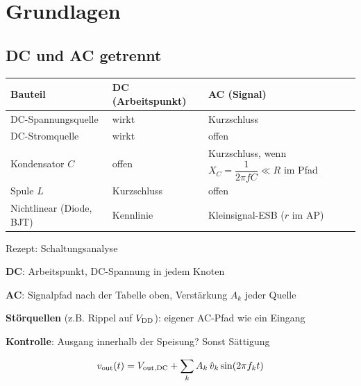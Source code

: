 \section{Grundlagen}\label{sec:grundlagen}

\subsection{DC und AC getrennt}

{\renewcommand{\arraystretch}{1.5}
\begin{tabularx}{\columnwidth}{@{}l l X@{}}
	\toprule
	\textbf{Bauteil}   & \textbf{DC (Arbeitspunkt)} & \textbf{AC (Signal)} \\ \midrule
	DC-Spannungsquelle & wirkt                      & Kurzschluss \\
	DC-Stromquelle     & wirkt                      & offen \\
	Kondensator $C$    & offen                      & Kurzschluss, wenn $X_C = \dfrac{1}{2\pi f C} \ll R$ im Pfad \\
	Spule $L$          & Kurzschluss                & offen \\
	Nichtlinear (Diode, BJT) & Kennlinie            & Kleinsignal-ESB ($r$ im AP) \\ \bottomrule
\end{tabularx}}

\begin{rezept}{Rezept: Schaltungsanalyse}
	\begin{steps}
		\item \textbf{DC}: Arbeitspunkt, DC-Spannung in jedem Knoten
		\item \textbf{AC}: Signalpfad nach der Tabelle oben, Verstärkung $A_k$ jeder Quelle
		\item \textbf{Störquellen} (z.B. Rippel auf $V_{\rm DD}$): eigener AC-Pfad wie ein Eingang
		\item \textbf{Kontrolle}: Ausgang innerhalb der Speisung? Sonst Sättigung
	\end{steps}
	$$ v_{\rm out}(t) = V_{\rm out,DC} + \sum_k A_k\,\hat v_k \sin(2\pi f_k t) $$
\end{rezept}


